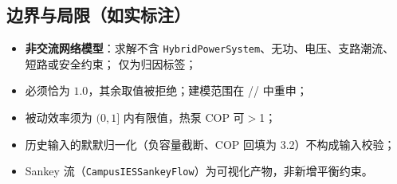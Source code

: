 \documentclass[UTF8,fontset=fandol,a4paper,11pt]{ctexart}
\begin{document}
\subsection{边界与局限（如实标注）}
\begin{itemize}
  \item \textbf{非交流网络模型}：求解不含 \texttt{HybridPowerSystem}、无功、电压、支路潮流、
        短路或安全约束； 仅为归因标签；
  \item {} 必须恰为 $1.0$，其余取值被拒绝；建模范围在
        // 中重申；
  \item 被动效率须为 $(0,1]$ 内有限值，热泵 COP 可$>$1；
  \item 历史输入的默默归一化（负容量截断、COP 回填为 3.2）不构成输入校验；
  \item Sankey 流（\texttt{CampusIESSankeyFlow}）为可视化产物，非新增平衡约束。
\end{itemize}

\end{document}
